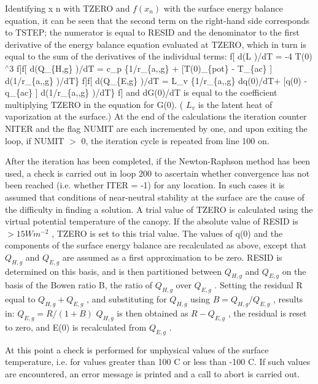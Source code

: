 Identifying x n with T\+Z\+E\+R\+O and $f(x_n )$ with the surface energy balance equation, it can be seen that the second term on the right-\/hand side corresponds to T\+S\+T\+E\+P; the numerator is equal to R\+E\+S\+I\+D and the denominator to the first derivative of the energy balance equation evaluated at T\+Z\+E\+R\+O, which in turn is equal to the sum of the derivatives of the individual terms\+: f\mbox{[} d(L  )/d\+T = -\/4  T(0)$^\wedge$3 f\mbox{]}f\mbox{[} d(Q\+\_\+\{H,g\} )/d\+T =  c\+\_\+p \{1/r\+\_\+\{a,,g\} + \mbox{[}T(0)\+\_\+\{pot\} -\/ T\+\_\+\{ac\} \mbox{]} d(1/r\+\_\+\{a,,g\} )/d\+T\} f\mbox{]}f\mbox{[} d(Q\+\_\+\{E,g\} )/d\+T = L\+\_\+v  \{1/r\+\_\+\{a,,g\} dq(0)/d\+T+ \mbox{[}q(0) -\/ q\+\_\+\{ac\} \mbox{]} d(1/r\+\_\+\{a,,g\} )/d\+T\} f\mbox{]} and d\+G(0)/d\+T is equal to the coefficient multiplying T\+Z\+E\+R\+O in the equation for G(0). ( $L_v$ is the latent heat of vaporization at the surface.) At the end of the calculations the iteration counter N\+I\+T\+E\+R and the flag N\+U\+M\+I\+T are each incremented by one, and upon exiting the loop, if N\+U\+M\+I\+T $>$ 0, the iteration cycle is repeated from line 100 on.

After the iteration has been completed, if the Newton-\/\+Raphson method has been used, a check is carried out in loop 200 to ascertain whether convergence has not been reached (i.\+e. whether I\+T\+E\+R = -\/1) for any location. In such cases it is assumed that conditions of near-\/neutral stability at the surface are the cause of the difficulty in finding a solution. A trial value of T\+Z\+E\+R\+O is calculated using the virtual potential temperature of the canopy. If the absolute value of R\+E\+S\+I\+D is $> 15 W m^{-2}$ , T\+Z\+E\+R\+O is set to this trial value. The values of q(0) and the components of the surface energy balance are recalculated as above, except that $Q_{H,g}$ and $Q_{E,g}$ are assumed as a first approximation to be zero. R\+E\+S\+I\+D is determined on this basis, and is then partitioned between $Q_{H,g}$ and $Q_{E,g}$ on the basis of the Bowen ratio B, the ratio of $Q_{H,g}$ over $Q_{E,g}$ . Setting the residual R equal to $Q_{H,g} + Q_{E,g}$ , and substituting for $Q_{H,g}$ using $B = Q_{H,g} /Q_{E,g}$ , results in\+: $Q_{E,g} = R/(1 + B)$ $Q_{H,g}$ is then obtained as $R - Q_{E,g}$ , the residual is reset to zero, and E(0) is recalculated from $Q_{E,g}$ .

At this point a check is performed for unphysical values of the surface temperature, i.\+e. for values greater than 100 C or less than -\/100 C. If such values are encountered, an error message is printed and a call to abort is carried out.


